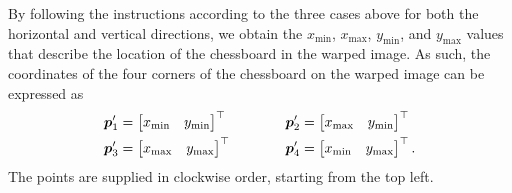 \documentclass[../main.tex]{subfiles}
\begin{document}
By following the instructions according to the three cases above for both the horizontal and vertical directions, we obtain the
$x_\text{min}$,
$x_\text{max}$,
$y_\text{min}$, and
$y_\text{max}$
values that describe the location of the chessboard in the warped image. 
As such, the coordinates of the four corners of the chessboard on the warped image can be expressed as
\begin{equation*}
    \begin{split}
        {\bm{p}}'_1 &= \begin{bmatrix}
            x_\text{min} & y_\text{min}
        \end{bmatrix}^\top \\
        {\bm{p}}'_3 &= \begin{bmatrix}
            x_\text{max} & y_\text{max}
        \end{bmatrix}^\top
    \end{split}
    \qquad\qquad
    \begin{split}
        {\bm{p}}'_2 &= \begin{bmatrix}
            x_\text{max} & y_\text{min}
        \end{bmatrix}^\top \\
        {\bm{p}}'_4 &= \begin{bmatrix}
            x_\text{min} & y_\text{max}
        \end{bmatrix}^\top.
    \end{split}
\end{equation*}
The points are supplied in clockwise order, starting from the top left.
\end{document}
